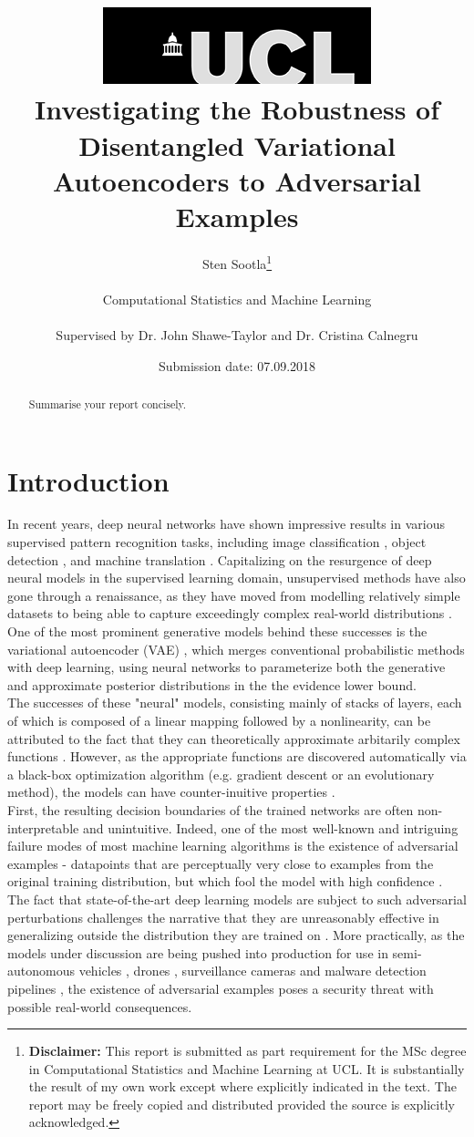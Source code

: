 \documentclass{report}
\title{{ \includegraphics[scale=.5,natwidth=294,natheight=84]{ucl_logo}}\\
{{\Huge Investigating the Robustness of Disentangled Variational Autoencoders to Adversarial Examples}}\\}
\date{Submission date: 07.09.2018}
\author{Sten Sootla\thanks{
{\bf Disclaimer:}
This report is submitted as part requirement for the MSc degree in Computational Statistics and Machine Learning at UCL. It is substantially the result of my own work except where explicitly indicated in the text. The report may be freely copied and distributed provided the source is explicitly acknowledged.}
\\ \\
Computational Statistics and Machine Learning\\ \\
Supervised by Dr. John Shawe-Taylor and Dr. Cristina Calnegru
}
\begin{document}
 
\onehalfspacing
\maketitle
\begin{abstract}
Summarise your report concisely.
\end{abstract}
\tableofcontents
\setcounter{page}{1}

\chapter{Introduction}

\noindent In recent years, deep neural networks have shown impressive results in various supervised pattern recognition tasks, including image classification \cite{alexnet, resnet}, object detection \cite{rcnn}, and machine translation \cite{nmt}. Capitalizing on the resurgence of deep neural models in the supervised learning domain, unsupervised methods have also gone through a renaissance, as they have moved from modelling relatively simple datasets \cite{rbm, helmholtz} to being able to capture exceedingly complex real-world distributions \cite{began, musicvae}. One of the most prominent generative models behind these successes is the variational autoencoder (VAE) \cite{vae}, which merges conventional probabilistic methods with deep learning, using neural networks to parameterize both the generative and approximate posterior distributions in the the evidence lower bound. \\

\noindent The successes of these "neural" models, consisting mainly of stacks of layers, each of which is composed of a linear mapping followed by a nonlinearity, can be attributed to the fact that they can theoretically approximate arbitarily complex functions \cite{Cybenko1989}. However, as the appropriate functions are discovered automatically via a black-box optimization algorithm (e.g. gradient descent or an evolutionary method), the models can have counter-inuitive properties \cite{intriguing-properties}. \\

\noindent First, the resulting decision boundaries of the trained networks are often non-interpretable and unintuitive. Indeed, one of the most well-known and intriguing failure modes of most machine learning algorithms is the existence of adversarial examples - datapoints that are perceptually very close to examples from the original training distribution, but which fool the model with high confidence \cite{intriguing-properties}. The fact that state-of-the-art deep learning models are subject to such adversarial perturbations challenges the narrative that they are unreasonably effective in generalizing outside the distribution they are trained on \cite{bengio-deep-architectures}. More practically, as the models under discussion are being pushed into production for use in semi-autonomous vehicles \cite{nvidia-self-driving-cars}, drones \cite{drones}, surveillance cameras \cite{surveillance-cameras} and malware detection pipelines \cite{malware}, the existence of adversarial examples poses a security threat with possible real-world consequences. \\
\end{document}
